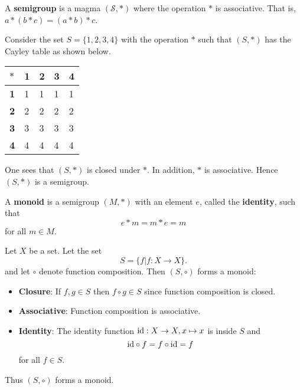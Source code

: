 \begin{definition}
    A \textbf{semigroup} is a magma $(\mathcal{S}, \ast)$ where the operation $\ast$ is associative. That is, $a\ast(b\ast c) = (a\ast b)\ast c$.
\end{definition}
\begin{example}
    Consider the set $S = \{1, 2, 3, 4\}$ with the operation $\ast$ such that $(S, \ast)$ has the Cayley table as shown below.
    \begin{table}[h]
        \centering
        \begin{tabular}{|l|l|l|l|l|}
            \hline
            $\ast$     & \textbf{1} & \textbf{2} & \textbf{3} & \textbf{4} \\ \hline
            \textbf{1} & 1          & 1          & 1          & 1          \\ \hline
            \textbf{2} & 2          & 2          & 2          & 2          \\ \hline
            \textbf{3} & 3          & 3          & 3          & 3          \\ \hline
            \textbf{4} & 4          & 4          & 4          & 4          \\ \hline
        \end{tabular}
    \end{table}
    
    One sees that $(S, \ast)$ is closed under $\ast$. In addition, $\ast$ is associative. Hence $(S, \ast)$ is a semigroup.
\end{example}

\begin{definition}
    A \textbf{monoid} is a semigroup $(M, \ast)$ with an element $e$, called the \textbf{identity}, such that
    \[
        e \ast m = m \ast e = m
    \]
    for all $m \in M$.
\end{definition}
\begin{example}
    Let $X$ be a set. Let the set
    \[
        S = \{f \vert  f: X \to X\}.
    \]
    and let $\circ$ denote function composition. Then $(S, \circ)$ forms a monoid:
    \begin{itemize}
        \item \textbf{Closure}: If $f, g \in S$ then $f\circ g \in S$ since function composition is closed.
        \item \textbf{Associative}: Function composition is associative.
        \item \textbf{Identity}: The identity function $\mathrm{id}: X \to X, x\mapsto x$ is inside $S$ and
        \[
            \mathrm{id} \circ f = f \circ \mathrm{id} = f
        \]
        for all $f \in S$.
    \end{itemize}
    Thus $(S, \circ)$ forms a monoid.
\end{example}

